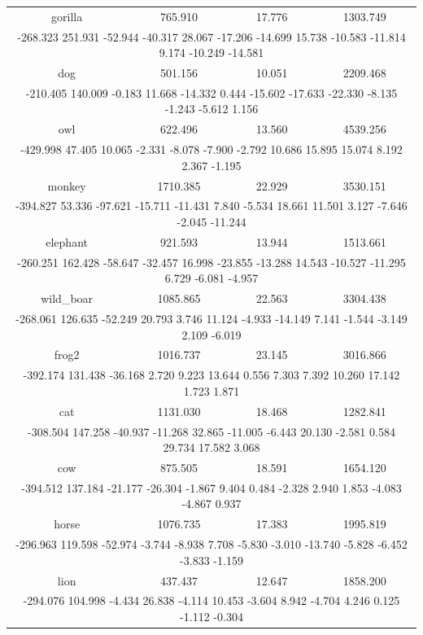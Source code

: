 \documentclass{article}
\begin{document}
\begin{tabular}{|c|c|c|c|}
gorilla & 765.910 & 17.776 & 1303.749 \\\multicolumn{4}{|c|}{-268.323 251.931 -52.944 -40.317 28.067 -17.206 -14.699 15.738 -10.583 -11.814 9.174 -10.249 -14.581 } \\ \hline
dog & 501.156 & 10.051 & 2209.468 \\\multicolumn{4}{|c|}{-210.405 140.009 -0.183 11.668 -14.332 0.444 -15.602 -17.633 -22.330 -8.135 -1.243 -5.612 1.156 } \\ \hline
owl & 622.496 & 13.560 & 4539.256 \\\multicolumn{4}{|c|}{-429.998 47.405 10.065 -2.331 -8.078 -7.900 -2.792 10.686 15.895 15.074 8.192 2.367 -1.195 } \\ \hline
monkey & 1710.385 & 22.929 & 3530.151 \\\multicolumn{4}{|c|}{-394.827 53.336 -97.621 -15.711 -11.431 7.840 -5.534 18.661 11.501 3.127 -7.646 -2.045 -11.244 } \\ \hline
elephant & 921.593 & 13.944 & 1513.661 \\\multicolumn{4}{|c|}{-260.251 162.428 -58.647 -32.457 16.998 -23.855 -13.288 14.543 -10.527 -11.295 6.729 -6.081 -4.957 } \\ \hline
wild\_boar & 1085.865 & 22.563 & 3304.438 \\\multicolumn{4}{|c|}{-268.061 126.635 -52.249 20.793 3.746 11.124 -4.933 -14.149 7.141 -1.544 -3.149 2.109 -6.019 } \\ \hline
frog2 & 1016.737 & 23.145 & 3016.866 \\\multicolumn{4}{|c|}{-392.174 131.438 -36.168 2.720 9.223 13.644 0.556 7.303 7.392 10.260 17.142 1.723 1.871 } \\ \hline
cat & 1131.030 & 18.468 & 1282.841 \\\multicolumn{4}{|c|}{-308.504 147.258 -40.937 -11.268 32.865 -11.005 -6.443 20.130 -2.581 0.584 29.734 17.582 3.068 } \\ \hline
cow & 875.505 & 18.591 & 1654.120 \\\multicolumn{4}{|c|}{-394.512 137.184 -21.177 -26.304 -1.867 9.404 0.484 -2.328 2.940 1.853 -4.083 -4.867 0.937 } \\ \hline
horse & 1076.735 & 17.383 & 1995.819 \\\multicolumn{4}{|c|}{-296.963 119.598 -52.974 -3.744 -8.938 7.708 -5.830 -3.010 -13.740 -5.828 -6.452 -3.833 -1.159 } \\ \hline
lion & 437.437 & 12.647 & 1858.200 \\\multicolumn{4}{|c|}{-294.076 104.998 -4.434 26.838 -4.114 10.453 -3.604 8.942 -4.704 4.246 0.125 -1.112 -0.304 } \\ \hline

\end{tabular}
\end{document}
